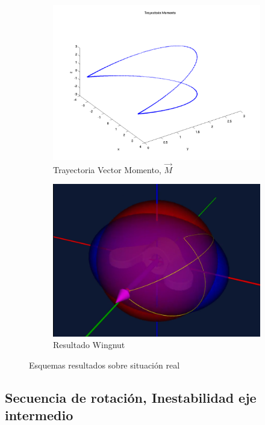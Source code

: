 \documentclass[oneside,a4paper,english,links]{amca}
\begin{document}
\begin{figure}[h]
\begin{subfigure}{.55\textwidth}
  \centering
  \includegraphics[width=.77\linewidth]{Figuras/Recorrido_Vel_angular_Body_rotada_simil_video.png}
  \caption{Trayectoria Vector Momento, $\vec{M}$}
  \label{fig:recorrido_trayectoria_momento_rotado_simil_video_mario}
\end{subfigure}
\begin{subfigure}{.55\textwidth}
  \centering
  \includegraphics[width=.77\linewidth]{Figuras/fig22.png}
  \caption{Resultado Wingnut}
  \label{fig:resultado_wingnut_video_mario}
\end{subfigure}
\caption{Esquemas resultados sobre situaci\'on real}
\label{fig:recorrido_vector_momento_subfigures_matlab_y_video_mario}
\end{figure}



\subsection{Secuencia de rotaci\'on, Inestabilidad eje intermedio}
\label{sec:secuencia_inestabilidad_eje_intermedio}
\end{document}
